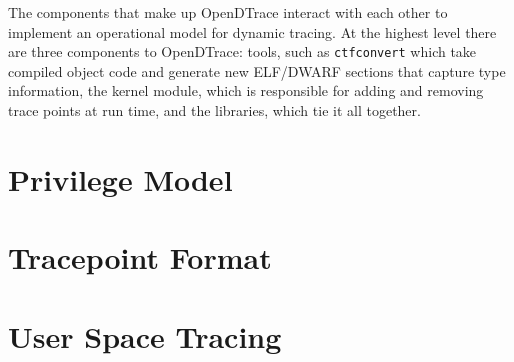 The components that make up OpenDTrace interact with each other to
implement an operational model for dynamic tracing.  At the highest
level there are three components to OpenDTrace: tools, such as
\texttt{ctfconvert} which take compiled object code and generate new
ELF/DWARF sections that capture type information, the kernel module,
which is responsible for adding and removing trace points at run time,
and the libraries, which tie it all together.

\section{Privilege Model}
\label{sec:privilege}

\section{Tracepoint Format}
\label{sec:tracepoint-format}

\section{User Space Tracing}
\label{sec:user-space}

